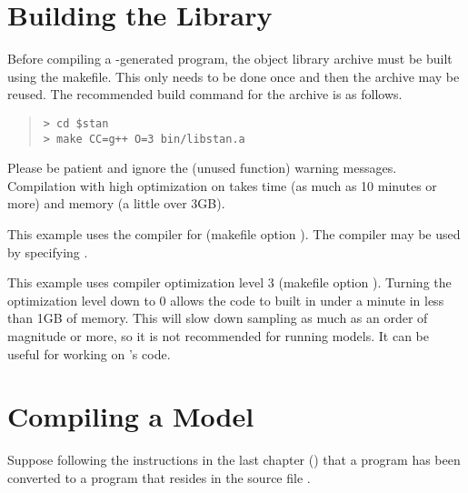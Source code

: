 \section{Building the \Stan Library}

Before compiling a \Stan-generated \Cpp program, the \Stan object
library archive must be built using the makefile.  This only needs to
be done once and then the archive may be reused.  The recommended
build command for the \Stan archive is as follows.
%
\begin{quote}
\begin{Verbatim}[fontshape=sl]
> cd $stan
> make CC=g++ O=3 bin/libstan.a 
\end{Verbatim}
\end{quote} %
%
Please be patient and ignore the (unused function) warning messages.
Compilation with high optimization on  takes time (as much
as 10 minutes or more) and memory (a little over 3GB). 

This example uses the  compiler for \Cpp (makefile option
).  The \clang compiler may be used by specifying
.

This example uses compiler optimization level 3 (makefile option
).  Turning the optimization level down to 0 allows the code
to built in under a minute in less than 1GB of memory.  This will slow
down sampling as much as an order of magnitude or more, so it is not
recommended for running models.  It can be useful for working on
\Stan's \Cpp code.


\section{Compiling a \Stan Model}

Suppose following the instructions in the last chapter
() that a \Stan program has been converted to a \Cpp
program that resides in the source file .

